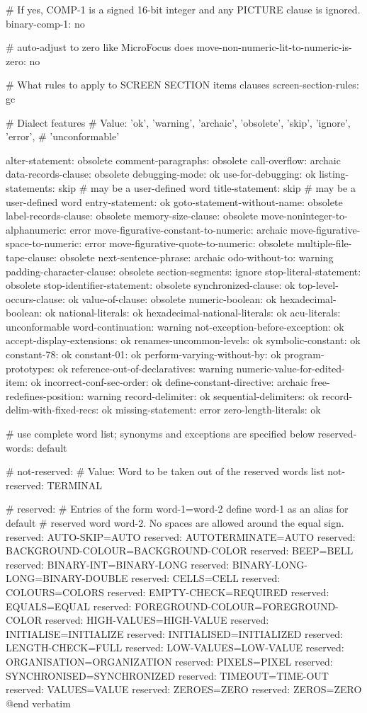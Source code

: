 # If yes, COMP-1 is a signed 16-bit integer and any PICTURE clause is ignored.
binary-comp-1:			no

# auto-adjust to zero like MicroFocus does
move-non-numeric-lit-to-numeric-is-zero: no

# What rules to apply to SCREEN SECTION items clauses
screen-section-rules:		gc

# Dialect features
# Value: 'ok', 'warning', 'archaic', 'obsolete', 'skip', 'ignore', 'error',
#        'unconformable'

alter-statement:			obsolete
comment-paragraphs:			obsolete
call-overflow:				archaic
data-records-clause:			obsolete
debugging-mode:				ok
use-for-debugging:			ok
listing-statements:			skip	# may be a user-defined word
title-statement:			skip	# may be a user-defined word
entry-statement:			ok
goto-statement-without-name:		obsolete
label-records-clause:			obsolete
memory-size-clause:			obsolete
move-noninteger-to-alphanumeric:	error
move-figurative-constant-to-numeric:	archaic
move-figurative-space-to-numeric:	error
move-figurative-quote-to-numeric:	obsolete
multiple-file-tape-clause:		obsolete
next-sentence-phrase:			archaic
odo-without-to:				warning
padding-character-clause:		obsolete
section-segments:			ignore
stop-literal-statement:			obsolete
stop-identifier-statement:		obsolete
synchronized-clause:			ok
top-level-occurs-clause:		ok
value-of-clause:			obsolete
numeric-boolean:			ok
hexadecimal-boolean:			ok
national-literals:			ok
hexadecimal-national-literals:		ok
acu-literals:				unconformable
word-continuation:			warning
not-exception-before-exception:		ok
accept-display-extensions:		ok
renames-uncommon-levels:		ok
symbolic-constant:			ok
constant-78:				ok
constant-01:				ok
perform-varying-without-by:		ok
program-prototypes:			ok
reference-out-of-declaratives:		warning
numeric-value-for-edited-item:		ok
incorrect-conf-sec-order:		ok
define-constant-directive:		archaic
free-redefines-position:		warning
record-delimiter:			ok
sequential-delimiters:			ok
record-delim-with-fixed-recs:		ok
missing-statement:			error
zero-length-literals:			ok


# use complete word list; synonyms and exceptions are specified below
reserved-words:		default

# not-reserved:
# Value: Word to be taken out of the reserved words list
not-reserved:	TERMINAL

# reserved:
#   Entries of the form word-1=word-2 define word-1 as an alias for default
# reserved word word-2. No spaces are allowed around the equal sign.
reserved:	AUTO-SKIP=AUTO
reserved:	AUTOTERMINATE=AUTO
reserved:	BACKGROUND-COLOUR=BACKGROUND-COLOR
reserved:	BEEP=BELL
reserved:	BINARY-INT=BINARY-LONG
reserved:	BINARY-LONG-LONG=BINARY-DOUBLE
reserved:	CELLS=CELL
reserved:	COLOURS=COLORS
reserved:	EMPTY-CHECK=REQUIRED
reserved:	EQUALS=EQUAL
reserved:	FOREGROUND-COLOUR=FOREGROUND-COLOR
reserved:	HIGH-VALUES=HIGH-VALUE
reserved:	INITIALISE=INITIALIZE
reserved:	INITIALISED=INITIALIZED
reserved:	LENGTH-CHECK=FULL
reserved:	LOW-VALUES=LOW-VALUE
reserved:	ORGANISATION=ORGANIZATION
reserved:	PIXELS=PIXEL
reserved:	SYNCHRONISED=SYNCHRONIZED
reserved:	TIMEOUT=TIME-OUT
reserved:	VALUES=VALUE
reserved:	ZEROES=ZERO
reserved:	ZEROS=ZERO
@end verbatim
